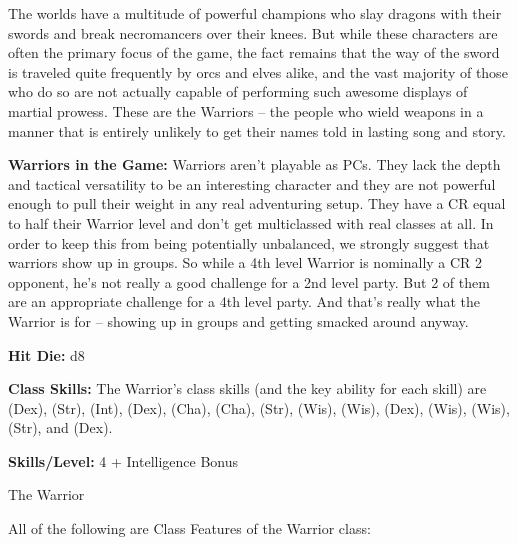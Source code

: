 
The worlds have a multitude of powerful champions who slay dragons with their swords and break necromancers over their knees. But while these characters are often the primary focus of the game, the fact remains that the way of the sword is traveled quite frequently by orcs and elves alike, and the vast majority of those who do so are not actually capable of performing such awesome displays of martial prowess. These are the Warriors -- the people who wield weapons in a manner that is entirely unlikely to get their names told in lasting song and story.

\textbf{Warriors in the Game:} Warriors aren't playable as PCs. They lack the depth and tactical versatility to be an interesting character and they are not powerful enough to pull their weight in any real adventuring setup. They have a CR equal to half their Warrior level and don't get multiclassed with real classes at all. In order to keep this from being potentially unbalanced, we strongly suggest that warriors show up in groups. So while a 4th level Warrior is nominally a CR 2 opponent, he's not really a good challenge for a 2nd level party. But 2 of them are an appropriate challenge for a 4th level party. And that's really what the Warrior is for -- showing up in groups and getting smacked around anyway.

\textbf{Hit Die:} d8

\textbf{Class Skills:} The Warrior's class skills (and the key ability for each skill) are  (Dex),  (Str),  (Int),  (Dex),  (Cha),  (Cha),  (Str),  (Wis),  (Wis),  (Dex),  (Wis),  (Wis),  (Str), and  (Dex).

\textbf{Skills/Level:} 4 + Intelligence Bonus

\goodbab
\poorfor
\poorref
\goodwil

\begin{classtable}{The Warrior}
\end{classtable}

\ClassFeatures
All of the following are Class Features of the Warrior class:


